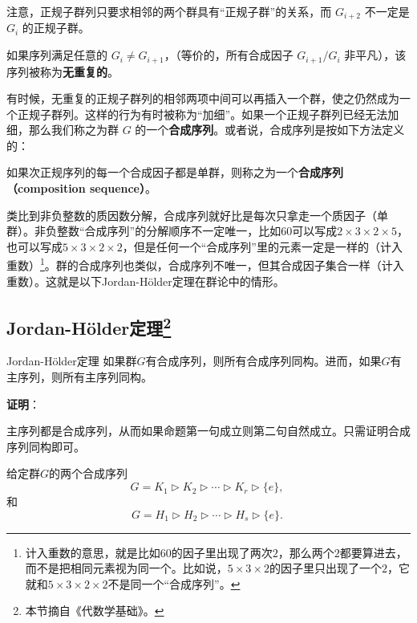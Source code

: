 注意，正规子群列只要求相邻的两个群具有“正规子群”的关系，而 $G_{i+2}$ 不一定是 $G_i$ 的正规子群。

如果序列满足任意的 $G_{i} \neq G_{i+1}$，（等价的，所有合成因子 $G_{i+1} / G_{i}$ 非平凡），该序列被称为\textbf{无重复的}。


有时候，无重复的正规子群列的相邻两项中间可以再插入一个群，使之仍然成为一个正规子群列。这样的行为有时被称为“加细”。如果一个正规子群列已经无法加细，那么我们称之为群 $G$ 的一个\textbf{合成序列}。或者说，合成序列是按如下方法定义的：

\begin{definition}{}

如果次正规序列的每一个合成因子都是单群，则称之为一个\textbf{合成序列（composition sequence）}。

\end{definition}


类比到非负整数的质因数分解，合成序列就好比是每次只拿走一个质因子（单群）。非负整数“合成序列”的分解顺序不一定唯一，比如$60$可以写成$2\times 3\times 2\times 5$，也可以写成$5\times 3\times 2\times 2$，但是任何一个“合成序列”里的元素一定是一样的（计入重数）\footnote{计入重数的意思，就是比如$60$的因子里出现了两次$2$，那么两个$2$都要算进去，而不是把相同元素视为同一个。比如说，$5\times 3 \times 2$的因子里只出现了一个$2$，它就和$5\times 3\times 2\times 2$不是同一个“合成序列”。}。群的合成序列也类似，合成序列不唯一，但其合成因子集合一样（计入重数）。这就是以下Jordan-Hölder定理在群论中的情形。






\subsection{Jordan-Hölder定理\footnote{本节摘自《代数学基础》。}}




\begin{theorem}{Jordan-Hölder定理}
如果群$G$有合成序列，则所有合成序列同构。进而，如果$G$有主序列，则所有主序列同构。
\end{theorem}


\textbf{证明}：

主序列都是合成序列，从而如果命题第一句成立则第二句自然成立。只需证明合成序列同构即可。

给定群$G$的两个合成序列
\begin{equation}
    G= K_1\rhd K_2\rhd \cdots \rhd K_r\rhd \{e\}, 
~\end{equation}
和
\begin{equation}
    G= H_1\rhd H_2\rhd \cdots \rhd H_s\rhd \{e\}. 
~\end{equation}



